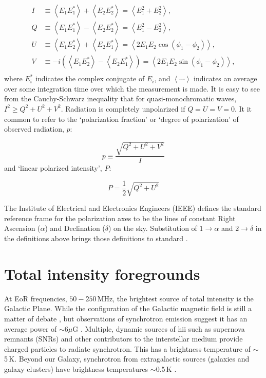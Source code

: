 \begin{align}
I &\equiv  \left\langle E_1E_1^* \right\rangle + \left\langle E_2E_2^* \right\rangle = \left\langle E_1^2 + E_2^2 \right\rangle, \\
Q &\equiv \left\langle E_1E_1^* \right\rangle - \left\langle E_2E_2^* \right\rangle = \left\langle E_1^2 - E_2^2 \right\rangle, \\
U &\equiv \left\langle E_1E_2^* \right\rangle + \left\langle E_2E_1^* \right\rangle = \left\langle 2 E_1 E_2 \cos(\phi_1 - \phi_2)\right\rangle, \\
V &\equiv -i (\left\langle E_1E_2^* \right\rangle - \left\langle E_2E_1^* \right\rangle) = \left\langle 2 E_1 E_2 \sin(\phi_1 - \phi_2)\right\rangle, \\
\end{align}
where $E_i^*$ indicates the complex conjugate of $E_i$, and $\left\langle \cdots \right\rangle$ indicates an average over some integration time over which the measurement is made. It is easy to see from the Cauchy-Schwarz inequality that for quasi-monochromatic waves, $I^2 \geq Q^2 + U^2 + V^2$. Radiation is completely unpolarized if $Q=U=V=0$. It it common to refer to the `polarization fraction' or `degree of polarization' of observed radiation, $p$:

\begin{equation}
p \equiv \frac{\sqrt{Q^2 + U^2 + V^2}}{I}
\end{equation}
and `linear polarized intensity', $P$:

\begin{equation}
P = \frac{1}{2}\sqrt{Q^2 + U^2}
\end{equation}

The Institute of Electrical and Electronics Engineers (IEEE) defines the standard reference frame for the polarization axes to be the lines of constant Right Ascension ($\alpha$) and Declination ($\delta$) on the sky. Substitution of $1\rightarrow\alpha$ and $2\rightarrow\delta$ in the definitions above brings those definitions to standard \citep{Cohen.58, Ludwig.73, vanStraten.10}.

\section{Total intensity foregrounds}

At EoR frequencies, $50 - 250$\,MHz, the brightest source of total intensity is the Galactic Plane. While the configuration of the Galactic magnetic field is still a matter of debate \citep[e.g.][]{Haverkorn.15}, but observations of synchrotron emission suggest it has an average power of $\sim6\mu$G \citep[e.g.][]{Beck.03}. Multiple, dynamic sources of {\sc hii} such as supernova remnants (SNRs) and other contributors to the interstellar medium provide charged particles to radiate synchrotron. This has a brightness temperature of $\sim$5\,K. Beyond our Galaxy, synchrotron from extragalactic sources (galaxies and galaxy clusters) have brightness temperatures $\sim$0.5\,K \citep[e.g.][]{Jelic.10}. 

